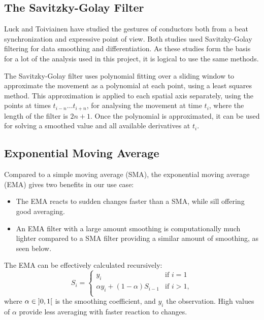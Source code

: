 \subsection{The Savitzky-Golay Filter}

Luck and Toiviainen have studied the gestures of conductors
both from a beat synchronization \cite{luck2006}
and expressive \cite{luck2010} point of view.
Both studies used Savitzky-Golay filtering
for data smoothing and differentiation.
As these studies form the basis for a lot
of the analysis used in this project,
it is logical to use the same methods.

The Savitzky-Golay filter uses polynomial fitting
over a sliding window to approximate the movement
as a polynomial at each point,
using a least squares method.
This approximation is applied to each spatial axis separately,
using the points at times $t_{i-n} \ldots t_{i+n}$,
for analysing the movement at time $t_i$,
where the length of the filter is $2n + 1$.
Once the polynomial is approximated,
it can be used for solving a smoothed value and
all available derivatives at $t_i$.

\subsection{Exponential Moving Average}

Compared to a simple moving average (SMA),
the exponential moving average (EMA)
gives two benefits in our use case:
\begin{itemize}
\item The EMA reacts to sudden changes faster than a SMA,
while sill offering good averaging.
\item An EMA filter with a large amount smoothing is computationally much
lighter compared to a SMA filter providing a similar amount of smoothing,
as seen below.
\end{itemize}
The EMA can be effectively calculated recursively:
\begin{equation}
S_i =
\begin{cases}
y_i & \text{if } i = 1 \\
\alpha y_i + ( 1 - \alpha ) S_{i-1} & \text{if } i > 1, \\
\end{cases}
\end{equation}
where $\alpha \in \mathopen] 0, 1 \mathclose[$ is the smoothing coefficient,
and $y_i$ the \nth[i] observation.
High values of $\alpha$
provide less averaging with faster reaction to changes.

